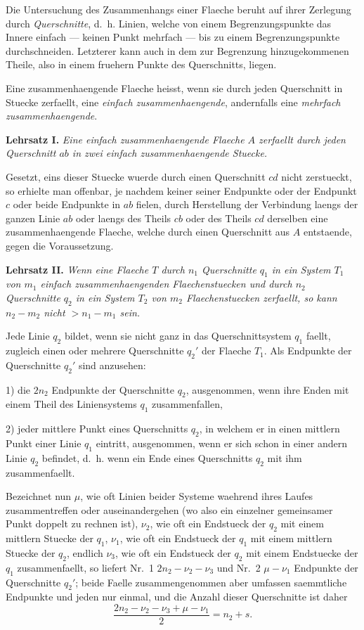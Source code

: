 \documentclass[12pt,a4paper]{book}
\theoremstyle{definition}
\theoremstyle{remark}
\begin{document}
Die Untersuchung des Zusammenhangs einer Flaeche beruht auf ihrer Zerlegung durch \emph{Querschnitte}, d.\ h. Linien, welche von einem Begrenzungspunkte das Innere einfach --- keinen Punkt mehrfach --- bis zu einem Begrenzungspunkte durchschneiden. Letzterer kann auch in dem zur Begrenzung hinzugekommenen Theile, also in einem fruehern Punkte des Querschnitts, liegen.

Eine zusammenhaengende Flaeche heisst, wenn sie durch jeden Querschnitt in Stuecke zerfaellt, eine \emph{einfach zusammenhaengende}, andernfalls eine \emph{mehrfach zusammenhaengende}.

\textbf{Lehrsatz I.} \emph{Eine einfach zusammenhaengende Flaeche $A$ zerfaellt durch jeden Querschnitt $ab$ in zwei einfach zusammenhaengende Stuecke.}

Gesetzt, eins dieser Stuecke wuerde durch einen Querschnitt $cd$ nicht zerstueckt, so erhielte man offenbar, je nachdem keiner seiner Endpunkte oder der Endpunkt $c$ oder beide Endpunkte in $ab$ fielen, durch Herstellung der Verbindung laengs der ganzen Linie $ab$ oder laengs des Theils $cb$ oder des Theils $cd$ derselben eine zusammenhaengende Flaeche, welche durch einen Querschnitt aus $A$ entstaende, gegen die Voraussetzung.

\textbf{Lehrsatz II.} \emph{Wenn eine Flaeche $T$ durch $n_1$ Querschnitte $q_1$ in ein System $T_1$ von $m_1$ einfach zusammenhaengenden Flaechenstuecken und durch $n_2$ Querschnitte $q_2$ in ein System $T_2$ von $m_2$ Flaechenstuecken zerfaellt, so kann $n_2 - m_2$ nicht $> n_1 - m_1$ sein.}

Jede Linie $q_2$ bildet, wenn sie nicht ganz in das Querschnittsystem $q_1$ faellt, zugleich einen oder mehrere Querschnitte $q_2'$ der Flaeche $T_1$. Als Endpunkte der Querschnitte $q_2'$ sind anzusehen:

1) die $2n_2$ Endpunkte der Querschnitte $q_2$, ausgenommen, wenn ihre Enden mit einem Theil des Liniensystems $q_1$ zusammenfallen,

2) jeder mittlere Punkt eines Querschnitts $q_2$, in welchem er in einen mittlern Punkt einer Linie $q_1$ eintritt, ausgenommen, wenn er sich schon in einer andern Linie $q_2$ befindet, d.\ h. wenn ein Ende eines Querschnitts $q_2$ mit ihm zusammenfaellt.

Bezeichnet nun $\mu$, wie oft Linien beider Systeme waehrend ihres Laufes zusammentreffen oder auseinandergehen (wo also ein einzelner gemeinsamer Punkt doppelt zu rechnen ist), $\nu_2$, wie oft ein Endstueck der $q_2$ mit einem mittlern Stuecke der $q_1$, $\nu_1$, wie oft ein Endstueck der $q_1$ mit einem mittlern Stuecke der $q_2$, endlich $\nu_3$, wie oft ein Endstueck der $q_2$ mit einem Endstuecke der $q_1$ zusammenfaellt, so liefert Nr.\ 1 $2n_2 - \nu_2 - \nu_3$ und Nr.\ 2 $\mu - \nu_1$ Endpunkte der Querschnitte $q_2'$; beide Faelle zusammengenommen aber umfassen saemmtliche Endpunkte und jeden nur einmal, und die Anzahl dieser Querschnitte ist daher
\[
\frac{2n_2 - \nu_2 - \nu_3 + \mu - \nu_1}{2} = n_2 + s.
\]
\end{document}

